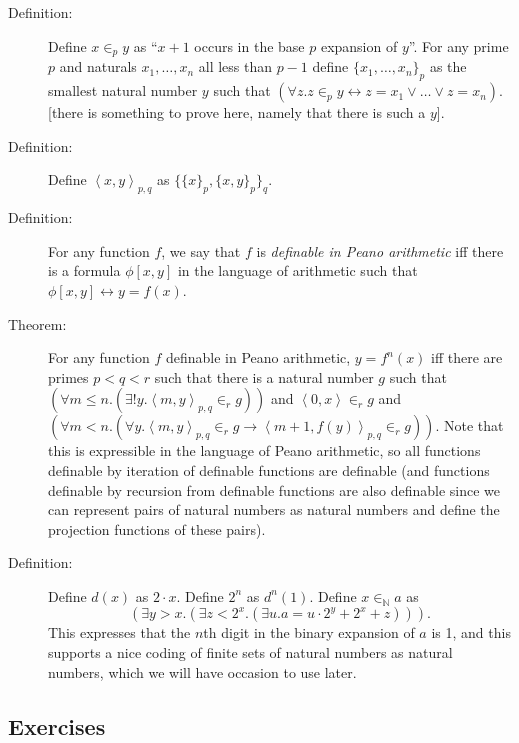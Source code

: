 \documentclass[12pt]{book}
\begin{document}
\begin{description}

\item[Definition:] Define $x \in_p y$ as ``$x+1$ occurs in the base
$p$ expansion of $y$''.  For any prime $p$ and naturals
$x_1,\ldots,x_n$ all less than $p-1$ define $\{x_1,\ldots,x_n\}_p$ as
the smallest natural number $y$ such that $(\forall z.z\in_p y \leftrightarrow
z=x_1 \vee\ldots\vee z=x_n)$. [there is something to prove here,
namely that there is such a $y$].

\item[Definition:] Define $\left<x,y\right>_{p,q}$ as
$\{\{x\}_p,\{x,y\}_p\}_q$.

\item[Definition:] For any function $f$, we say that $f$ is {\em definable in
Peano arithmetic\/} iff there is a formula $\phi[x,y]$ in the language of
arithmetic such that $\phi[x,y] \leftrightarrow y=f(x)$.

\item[Theorem:] For any function $f$ definable in Peano arithmetic, $y
= f^n(x)$ iff there are primes $p<q<r$ such that there is a natural
number $g$ such that $(\forall m\leq n.(\exists!
y.\left<m,y\right>_{p,q} \in_r g))$ and $\left<0,x\right> \in_r g$ and
$(\forall m<n.(\forall y.\left<m,y\right>_{p,q} \in_r g \rightarrow
\left<m+1,f(y)\right>_{p,q}\in_r g))$.  Note that this is expressible in the
language of Peano arithmetic, so all functions definable by iteration
of definable functions are definable (and functions definable by
recursion from definable functions are also definable since we can
represent pairs of natural numbers as natural numbers and define the
projection functions of these pairs).

\item[Definition:] Define $d(x)$ as $2\cdot x$.  Define $2^n$ as
$d^n(1)$.  Define $x \in_{\mathbb N} a$ as $$(\exists y>x.(\exists
z<2^x.(\exists u.a = u\cdot 2^y+2^x+z))).$$ This expresses that the
$n$th digit in the binary expansion of $a$ is 1, and this supports a
nice coding of finite sets of natural numbers as natural numbers,
which we will have occasion to use later.

\end{description}

\newpage

\subsection{Exercises}
\end{document}
